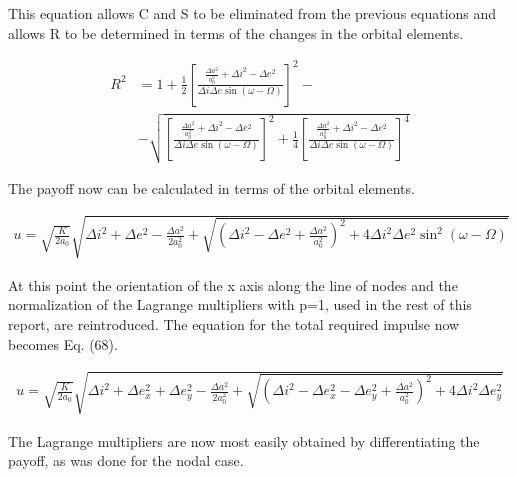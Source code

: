 \documentclass[12pt]{article}
\begin{document}
This equation allows C and S to be eliminated from the previous equations and allows R to be determined in terms of the changes in the orbital elements.

\begin{align}
R^2 &= 1 + \frac{1}{2} \left[ \frac{\frac{\Delta a^2}{a_0^2} + \Delta i^2 - \Delta e^2}{\Delta i \Delta e \sin (\omega - \Omega)} \right]^2 - \\
&- \sqrt{\left[ \frac{\frac{\Delta a^2}{a_0^2} + \Delta i^2 - \Delta e^2}{\Delta i \Delta e \sin (\omega - \Omega)} \right]^2 + \frac{1}{4} \left[ \frac{\frac{\Delta a^2}{a_0^2} + \Delta i^2 - \Delta e^2}{\Delta i \Delta e \sin (\omega - \Omega)} \right]^4} \tag{66}
\end{align}

The payoff now can be calculated in terms of the orbital elements.

\begin{align}
u = \sqrt{\frac{K}{2a_0}} \sqrt{\Delta i^2 + \Delta e^2 - \frac{\Delta a^2}{2a_0^2} + \sqrt{\left( \Delta i^2 - \Delta e^2 + \frac{\Delta a^2}{a_0^2} \right)^2 + 4 \Delta i^2 \Delta e^2 \sin^2 (\omega - \Omega)}} \tag{67}
\end{align}

At this point the orientation of the x axis along the line of nodes and the normalization of the Lagrange multipliers with p=1, used in the rest of this report, are reintroduced. The equation for the total required impulse now becomes Eq. (68).

\begin{align}
u = \sqrt{\frac{K}{2a_0}} \sqrt{\Delta i^2 + \Delta e_x^2 + \Delta e_y^2 - \frac{\Delta a^2}{2a_0^2} + \sqrt{\left( \Delta i^2 - \Delta e_x^2 - \Delta e_y^2 + \frac{\Delta a^2}{a_0^2} \right)^2 + 4 \Delta i^2 \Delta e_y^2}} \tag{68}
\end{align}

The Lagrange multipliers are now most easily obtained by differentiating the payoff, as was done for the nodal case.
\end{document}
